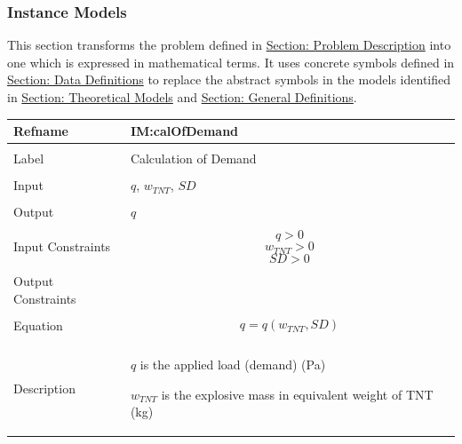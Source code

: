 \documentclass[12pt]{article}
\begin{document}
\subsubsection{Instance Models}
\label{Sec:IMs}
This section transforms the problem defined in \hyperref[Sec:ProbDesc]{Section: Problem Description} into one which is expressed in mathematical terms. It uses concrete symbols defined in \hyperref[Sec:DDs]{Section: Data Definitions} to replace the abstract symbols in the models identified in \hyperref[Sec:TMs]{Section: Theoretical Models} and \hyperref[Sec:GDs]{Section: General Definitions}.
~\newline
\noindent \begin{minipage}{\textwidth}
\begin{tabular}{p{} p{}}
\toprule \textbf{Refname} & \textbf{IM:calOfDemand}
\label{IM:calOfDemand}
\\ \midrule \\
Label & Calculation of Demand
\\ \midrule \\
Input & $q$, ${w_{TNT}}$, $SD$
\\ \midrule \\
Output & $q$
\\ \midrule \\
Input Constraints & \begin{dmath}
                    q>0
                    \end{dmath}
                    \begin{dmath}
                    {w_{TNT}}>0
                    \end{dmath}
                    \begin{dmath}
                    SD>0
                    \end{dmath}
\\ \midrule \\
Output Constraints & 
\\ \midrule \\
Equation & \begin{dmath}
           q=q\left({w_{TNT}},SD\right)
           \end{dmath}
\\ \midrule \\
Description & \begin{symbDescription}
              \item{$q$ is the applied load (demand) (Pa)}
              \item{${w_{TNT}}$ is the explosive mass in equivalent weight of TNT (kg)}

\end{symbDescription}
\end{tabular}
\end{minipage}
\end{document}
